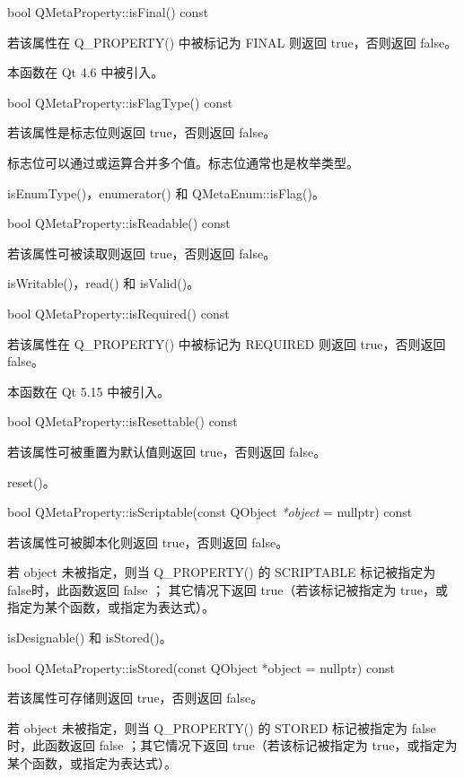 bool QMetaProperty::isFinal() const

若该属性在 Q\_PROPERTY() 中被标记为 FINAL 则返回 true，否则返回 false。

本函数在 Qt 4.6 中被引入。

bool QMetaProperty::isFlagType() const

若该属性是标志位则返回 true，否则返回 false。

标志位可以通过或运算合并多个值。标志位通常也是枚举类型。

\begin{seeAlso}
isEnumType()，enumerator() 和 QMetaEnum::isFlag()。
\end{seeAlso}

bool QMetaProperty::isReadable() const

若该属性可被读取则返回 true，否则返回 false。

\begin{seeAlso}
isWritable()，read() 和 isValid()。
\end{seeAlso}

bool QMetaProperty::isRequired() const

若该属性在 Q\_PROPERTY() 中被标记为 REQUIRED 则返回 true，否则返回 false。

本函数在 Qt 5.15 中被引入。

bool QMetaProperty::isResettable() const

若该属性可被重置为默认值则返回 true，否则返回 false。

\begin{seeAlso}
reset()。
\end{seeAlso}

bool QMetaProperty::isScriptable(const QObject \emph{*object} = nullptr) const

若该属性可被脚本化则返回 true，否则返回 false。

若 object 未被指定，则当 Q\_PROPERTY() 的 SCRIPTABLE 标记被指定为 false时，此函数返回 false ；
其它情况下返回 true（若该标记被指定为 true，或指定为某个函数，或指定为表达式）。

\begin{seeAlso}
isDesignable() 和 isStored()。
\end{seeAlso}

bool QMetaProperty::isStored(const QObject *object = nullptr) const

若该属性可存储则返回 true，否则返回 false。

若 object 未被指定，则当 Q\_PROPERTY() 的 STORED 标记被指定为 false时，此函数返回 false ；其它情况下返回 true（若该标记被指定为 true，或指定为某个函数，或指定为表达式）。


